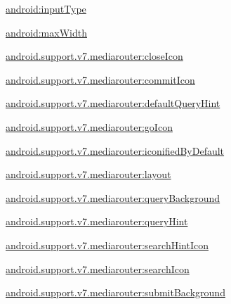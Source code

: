 {\ttfamily \hyperlink{classandroid_1_1support_1_1v7_1_1mediarouter_1_1R_1_1styleable_a2ba4d91c907ae2c795917d5130b61808}{android\+:input\+Type}}

{\ttfamily \hyperlink{classandroid_1_1support_1_1v7_1_1mediarouter_1_1R_1_1styleable_a937cf9b30ff311ddda2782bc237be919}{android\+:max\+Width}}

{\ttfamily \hyperlink{classandroid_1_1support_1_1v7_1_1mediarouter_1_1R_1_1styleable_adc953a78777a6f78846028fcb3c7c1aa}{android.\+support.\+v7.\+mediarouter\+:close\+Icon}}

{\ttfamily \hyperlink{classandroid_1_1support_1_1v7_1_1mediarouter_1_1R_1_1styleable_ae0021e7caae5581aab60a4f50e79af40}{android.\+support.\+v7.\+mediarouter\+:commit\+Icon}}

{\ttfamily \hyperlink{classandroid_1_1support_1_1v7_1_1mediarouter_1_1R_1_1styleable_a4bee2315e2c3bab5b734df62936a8ad9}{android.\+support.\+v7.\+mediarouter\+:default\+Query\+Hint}}

{\ttfamily \hyperlink{classandroid_1_1support_1_1v7_1_1mediarouter_1_1R_1_1styleable_a3caf53e79313da629e99a8bb5fe0a8f8}{android.\+support.\+v7.\+mediarouter\+:go\+Icon}}

{\ttfamily \hyperlink{classandroid_1_1support_1_1v7_1_1mediarouter_1_1R_1_1styleable_a8d919271ebc1a35d5b4d097c8a4fef08}{android.\+support.\+v7.\+mediarouter\+:iconified\+By\+Default}}

{\ttfamily \hyperlink{classandroid_1_1support_1_1v7_1_1mediarouter_1_1R_1_1styleable_a0261fec701a8d342dc4392b2612e4fdc}{android.\+support.\+v7.\+mediarouter\+:layout}}

{\ttfamily \hyperlink{classandroid_1_1support_1_1v7_1_1mediarouter_1_1R_1_1styleable_a3ac6b81bd921b428110700ffe00dfa9f}{android.\+support.\+v7.\+mediarouter\+:query\+Background}}

{\ttfamily \hyperlink{classandroid_1_1support_1_1v7_1_1mediarouter_1_1R_1_1styleable_a8a63f4bf8bd850c17ab2faf9d9eb2305}{android.\+support.\+v7.\+mediarouter\+:query\+Hint}}

{\ttfamily \hyperlink{classandroid_1_1support_1_1v7_1_1mediarouter_1_1R_1_1styleable_aee7fbb570a505fe3f44e8575152ffd62}{android.\+support.\+v7.\+mediarouter\+:search\+Hint\+Icon}}

{\ttfamily \hyperlink{classandroid_1_1support_1_1v7_1_1mediarouter_1_1R_1_1styleable_ab07321daa4d83a526ba178c813f21613}{android.\+support.\+v7.\+mediarouter\+:search\+Icon}}

{\ttfamily \hyperlink{classandroid_1_1support_1_1v7_1_1mediarouter_1_1R_1_1styleable_ae515cfc893e5d3141dabbb0ddfecaa09}{android.\+support.\+v7.\+mediarouter\+:submit\+Background}}


